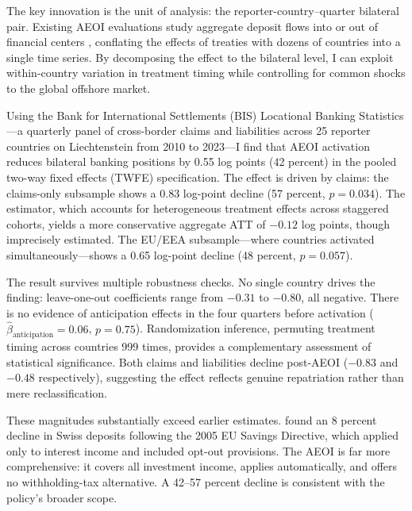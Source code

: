 \documentclass[12pt]{article}
\begin{document}
The key innovation is the unit of analysis: the reporter-country--quarter bilateral pair. Existing AEOI evaluations study aggregate deposit flows into or out of financial centers \citep{johannesen2014end, menkhoff2022tax, obrien2019have}, conflating the effects of treaties with dozens of countries into a single time series. By decomposing the effect to the bilateral level, I can exploit within-country variation in treatment timing while controlling for common shocks to the global offshore market.

Using the Bank for International Settlements (BIS) Locational Banking Statistics---a quarterly panel of cross-border claims and liabilities across 25 reporter countries on Liechtenstein from 2010 to 2023---I find that AEOI activation reduces bilateral banking positions by 0.55 log points (42 percent) in the pooled two-way fixed effects (TWFE) specification. The effect is driven by claims: the claims-only subsample shows a 0.83 log-point decline (57 percent, $p = 0.034$). The \citet{sun2021estimating} estimator, which accounts for heterogeneous treatment effects across staggered cohorts, yields a more conservative aggregate ATT of $-0.12$ log points, though imprecisely estimated. The EU/EEA subsample---where countries activated simultaneously---shows a 0.65 log-point decline (48 percent, $p = 0.057$).

The result survives multiple robustness checks. No single country drives the finding: leave-one-out coefficients range from $-0.31$ to $-0.80$, all negative. There is no evidence of anticipation effects in the four quarters before activation ($\hat{\beta}_{\text{anticipation}} = 0.06$, $p = 0.75$). Randomization inference, permuting treatment timing across countries 999 times, provides a complementary assessment of statistical significance. Both claims and liabilities decline post-AEOI ($-0.83$ and $-0.48$ respectively), suggesting the effect reflects genuine repatriation rather than mere reclassification.

These magnitudes substantially exceed earlier estimates. \citet{johannesen2014end} found an 8 percent decline in Swiss deposits following the 2005 EU Savings Directive, which applied only to interest income and included opt-out provisions. The AEOI is far more comprehensive: it covers all investment income, applies automatically, and offers no withholding-tax alternative. A 42--57 percent decline is consistent with the policy's broader scope.
\end{document}
